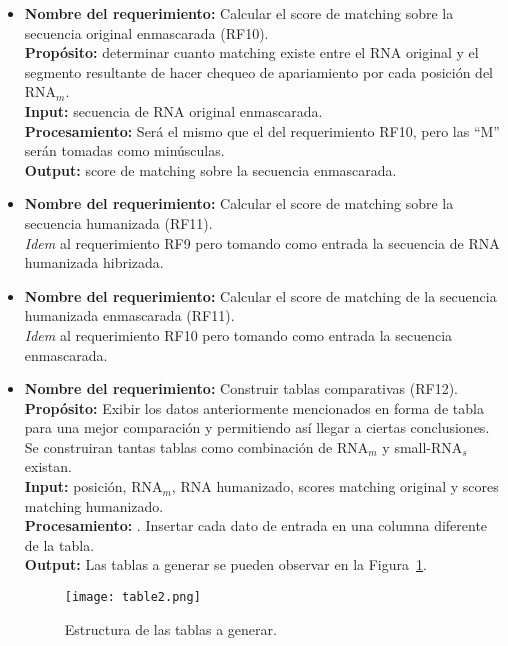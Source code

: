 \documentclass[12pt,a4paper,spanish]{article}
\begin{document}
\begin{itemize}
		\item \textbf{Nombre del requerimiento:} Calcular el score de matching sobre la secuencia original enmascarada 			(RF10).\\
 	    \textbf{Propósito:} determinar cuanto matching existe entre el RNA original y el segmento resultante de hacer 								chequeo de apariamiento por cada posición del RNA$_m$.\\
		\textbf{Input:} secuencia de RNA original enmascarada. \\
		\textbf{Procesamiento:} Será el mismo que el del requerimiento RF10, pero las ``M'' serán tomadas como 			 
        minúsculas.	\\
		\textbf{Output:} score de matching sobre la secuencia enmascarada.\\

		\item \textbf{Nombre del requerimiento:} Calcular el score de matching sobre la secuencia humanizada (RF11).\\
		\textit{Idem} al requerimiento RF9 pero tomando como entrada la secuencia de RNA humanizada hibrizada. \\

		\item \textbf{Nombre del requerimiento:} Calcular el score de matching de la secuencia humanizada enmascarada 			(RF11).\\
		\textit{Idem} al requerimiento RF10 pero tomando como entrada la secuencia enmascarada. \\	

		\item \textbf{Nombre del requerimiento:} Construir tablas comparativas (RF12).\\
 	    \textbf{Propósito:} Exibir los datos anteriormente mencionados en forma de tabla para una mejor comparación y 								permitiendo así llegar a ciertas conclusiones. Se construiran tantas tablas como combinación 								de RNA$_m$ y small-RNA$_s$ existan.\\
		\textbf{Input:} posición, RNA$_m$, RNA humanizado, scores matching original y scores matching humanizado.\\
		\textbf{Procesamiento:} . Insertar cada dato de entrada en una columna diferente de la tabla.\\
		\textbf{Output:} Las tablas a generar se pueden observar en la Figura~\ref{table}.
			\vskip 0.5cm
			\begin{figure}[h]
				\begin{center}
					\texttt{[image: table2.png]}
					\caption{Estructura de las tablas a generar.}
					\label{table}
				\end{center}
			\end{figure}
		

\end{itemize}
\end{document}
